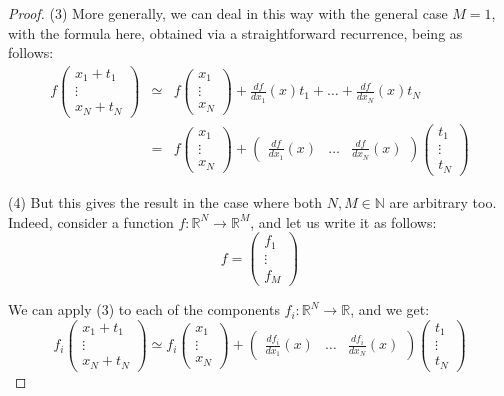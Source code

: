 \documentclass[12pt]{amsbook}
\begin{document}
\begin{proof}
(3) More generally, we can deal in this way with the general case $M=1$, with the formula here, obtained via a straightforward recurrence, being as follows:
\begin{eqnarray*}
f\begin{pmatrix}x_1+t_1\\ \vdots\\ x_N+t_N\end{pmatrix}
&\simeq&f\begin{pmatrix}x_1\\ \vdots\\ x_N\end{pmatrix}+\frac{df}{dx_1}(x)t_1+\ldots+\frac{df}{dx_N}(x)t_N\\
&=&f\begin{pmatrix}x_1\\ \vdots\\ x_N\end{pmatrix}+
\begin{pmatrix}\frac{df}{dx_1}(x)&\ldots&\frac{df}{dx_N}(x)\end{pmatrix}
\begin{pmatrix}t_1\\ \vdots\\ t_N\end{pmatrix}
\end{eqnarray*}

(4) But this gives the result in the case where both $N,M\in\mathbb N$ are arbitrary too. Indeed, consider a function $f:\mathbb R^N\to\mathbb R^M$, and let us write it as follows:
$$f=\begin{pmatrix}f_1\\ \vdots\\ f_M\end{pmatrix}$$

We can apply (3) to each of the components $f_i:\mathbb R^N\to\mathbb R$, and we get:
$$f_i\begin{pmatrix}x_1+t_1\\ \vdots\\ x_N+t_N\end{pmatrix}
\simeq f_i\begin{pmatrix}x_1\\ \vdots\\ x_N\end{pmatrix}+
\begin{pmatrix}\frac{df_i}{dx_1}(x)&\ldots&\frac{df_i}{dx_N}(x)\end{pmatrix}
\begin{pmatrix}t_1\\ \vdots\\ t_N\end{pmatrix}$$


\end{proof}
\end{document}
